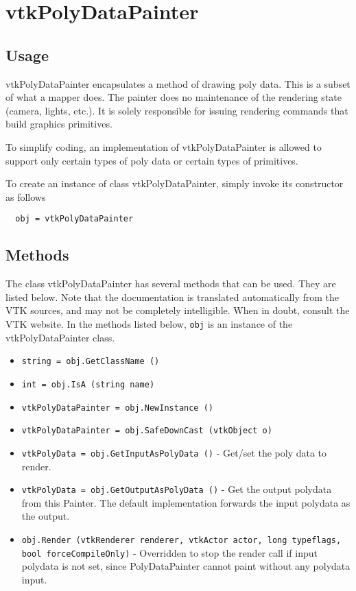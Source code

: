 \section{vtkPolyDataPainter}

\subsection{Usage}

 vtkPolyDataPainter encapsulates a method of drawing poly data.  This is a subset
 of what a mapper does.  The painter does no maintenance of the rendering
 state (camera, lights, etc.).  It is solely responsible for issuing
 rendering commands that build graphics primitives.

 To simplify coding, an implementation of vtkPolyDataPainter is allowed to support
 only certain types of poly data or certain types of primitives. 


To create an instance of class vtkPolyDataPainter, simply
invoke its constructor as follows
\begin{verbatim}
  obj = vtkPolyDataPainter
\end{verbatim}
\subsection{Methods}

The class vtkPolyDataPainter has several methods that can be used.
  They are listed below.
Note that the documentation is translated automatically from the VTK sources,
and may not be completely intelligible.  When in doubt, consult the VTK website.
In the methods listed below, \verb|obj| is an instance of the vtkPolyDataPainter class.
\begin{itemize}
\item  \verb|string = obj.GetClassName ()|

\item  \verb|int = obj.IsA (string name)|

\item  \verb|vtkPolyDataPainter = obj.NewInstance ()|

\item  \verb|vtkPolyDataPainter = obj.SafeDownCast (vtkObject o)|

\item  \verb|vtkPolyData = obj.GetInputAsPolyData ()| -  Get/set the poly data to render.

\item  \verb|vtkPolyData = obj.GetOutputAsPolyData ()| -  Get the output polydata from this Painter. The default 
 implementation forwards the input polydata as the output.

\item  \verb|obj.Render (vtkRenderer renderer, vtkActor actor, long typeflags, bool forceCompileOnly)| -  Overridden to stop the render call if input polydata is not set,
 since PolyDataPainter cannot paint without any polydata input.

\end{itemize}
